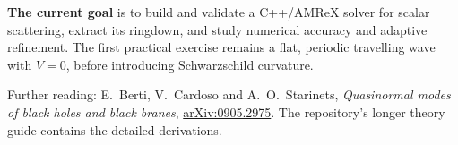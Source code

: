 \documentclass[11pt,a4paper]{article}
\begin{document}
\textbf{The current goal} is to build and validate a C++/AMReX solver for
scalar scattering, extract its ringdown, and study numerical accuracy
and adaptive refinement. The first practical exercise remains a flat,
periodic travelling wave with \(V=0\), before introducing Schwarzschild
curvature.

\smallskip
\small
Further reading: E.~Berti, V.~Cardoso and A.~O.~Starinets,
\emph{Quasinormal modes of black holes and black branes},
\href{https://arxiv.org/abs/0905.2975}{arXiv:0905.2975}.
The repository's longer theory guide contains the detailed derivations.
\end{document}
